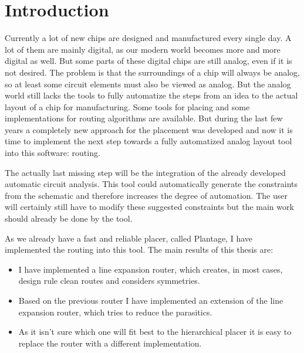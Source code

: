 \chapter{Introduction}

Currently a lot of new chips are designed and manufactured every single day. A lot of them are mainly digital, as our modern world becomes more and more digital as well. But some parts of these digital chips are still analog, even if it is not desired. The problem is that the surroundings of a chip will always be analog, so at least some circuit elements must also be viewed as analog. But the analog world still lacks the tools to fully automatize the steps from an idea to the actual layout of a chip for manufacturing. Some tools for placing and some implementations for routing algorithms are available. But during the last few years a completely new approach for the placement was developed and now it is time to implement the next step towards a fully automatized analog layout tool into this software: routing.

The actually last missing step will be the integration of the already developed automatic circuit analysis. This tool could automatically generate the constraints from the schematic and therefore increases the degree of automation. The user will certainly still have to modify these suggested constraints but the main work should already be done by the tool.

As we already have a fast and reliable placer, called Plantage, I have implemented the routing into this tool. The main results of this thesis are:
\begin{itemize}
\item I have implemented a line expansion router, which creates, in most cases, design rule clean routes and considers symmetries.
\item Based on the previous router I have implemented an extension of the line expansion router, which tries to reduce the parasitics.
\item As it isn't sure which one will fit best to the hierarchical placer it is easy to replace the router with a different implementation.
\end{itemize}